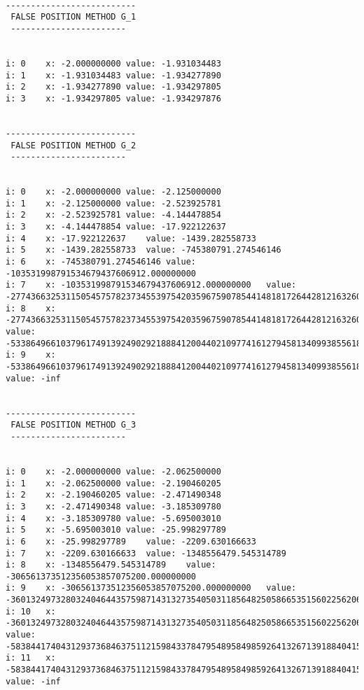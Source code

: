 \documentclass[11pt]{article} %
\begin{document}
\begin{verbatim}

--------------------------
 FALSE POSITION METHOD G_1
 -----------------------


i: 0	x: -2.000000000	value: -1.931034483
i: 1	x: -1.931034483	value: -1.934277890
i: 2	x: -1.934277890	value: -1.934297805
i: 3	x: -1.934297805	value: -1.934297876


--------------------------
 FALSE POSITION METHOD G_2
 -----------------------


i: 0	x: -2.000000000	value: -2.125000000
i: 1	x: -2.125000000	value: -2.523925781
i: 2	x: -2.523925781	value: -4.144478854
i: 3	x: -4.144478854	value: -17.922122637
i: 4	x: -17.922122637	value: -1439.282558733
i: 5	x: -1439.282558733	value: -745380791.274546146
i: 6	x: -745380791.274546146	value: -103531998791534679437606912.000000000
i: 7	x: -103531998791534679437606912.000000000	value: -277436632531150545757823734553975420359675907854414818172644281216326044745728.000000000
i: 8	x: -277436632531150545757823734553975420359675907854414818172644281216326044745728.000000000	value: -5338649661037961749139249029218884120044021097741612794581340993855618575359718306423820075038864794766104374691444918767173834991285325884453612284250387716704357639249146159480027431914962774780796808037723725177713273312943013888.000000000
i: 9	x: -5338649661037961749139249029218884120044021097741612794581340993855618575359718306423820075038864794766104374691444918767173834991285325884453612284250387716704357639249146159480027431914962774780796808037723725177713273312943013888.000000000	value: -inf


--------------------------
 FALSE POSITION METHOD G_3
 -----------------------


i: 0	x: -2.000000000	value: -2.062500000
i: 1	x: -2.062500000	value: -2.190460205
i: 2	x: -2.190460205	value: -2.471490348
i: 3	x: -2.471490348	value: -3.185309780
i: 4	x: -3.185309780	value: -5.695003010
i: 5	x: -5.695003010	value: -25.998297789
i: 6	x: -25.998297789	value: -2209.630166633
i: 7	x: -2209.630166633	value: -1348556479.545314789
i: 8	x: -1348556479.545314789	value: -306561373512356053857075200.000000000
i: 9	x: -306561373512356053857075200.000000000	value: -3601324973280324046443575987143132735405031185648250586653515602256206860648448.000000000
i: 10	x: -3601324973280324046443575987143132735405031185648250586653515602256206860648448.000000000	value: -5838441740431293736846375112159843378479548958498592641326713918840415288458319616919365577067854597585843267656730675183562270570075310780791649077600094659651591378755325763230752325937701298656699774349701532742109721820722207129600.000000000
i: 11	x: -5838441740431293736846375112159843378479548958498592641326713918840415288458319616919365577067854597585843267656730675183562270570075310780791649077600094659651591378755325763230752325937701298656699774349701532742109721820722207129600.000000000	value: -inf

\end{verbatim}
\end{document}
